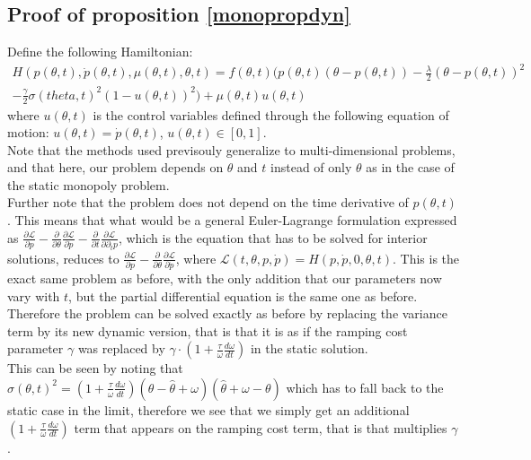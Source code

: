 \begin{subappendices}
\section{Proof of proposition \ref{monopropdyn}}\label{monopdyn_proof}

Define the following Hamiltonian: 
\begin{equation}
\begin{split}
H(p(\theta,t),\dot{p}(\theta,t),\mu(\theta,t),\theta,t)= f(\theta,t)\bigg( p(\theta,t)(\theta-p(\theta,t))-\frac{\lambda}{2}(\theta-p(\theta,t))^2\\
-\frac{\gamma}{2}\sigma(theta,t)^2\left(1-u(\theta,t)\right)^2\bigg)+\mu(\theta,t) u(\theta,t)
\end{split}
\end{equation}
where $u(\theta,t)$ is the control variables defined through the following equation of motion: $u(\theta,t)=\dot{p}(\theta,t)$, $u(\theta,t)\in[0,1]$. \\

Note that the methods used previsouly generalize to multi-dimensional problems, and that here, our problem depends on $\theta$ and $t$ instead of only $\theta$ as in the case of the static monopoly problem. \\

Further note that the problem does not depend on the time derivative of $p(\theta,t)$. This means that what would be a general Euler-Lagrange formulation expressed as $\frac{\partial\mathcal{L}}{\partial p} - \frac{\partial}{\partial \theta}\frac{\partial \mathcal{L}}{\partial \dot{p}} - \frac{\partial}{\partial t}\frac{\partial \mathcal{L}}{\partial \partial_t p}$, which is the equation that has to be solved for interior solutions, reduces to  $\frac{\partial\mathcal{L}}{\partial p} - \frac{\partial}{\partial \theta}\frac{\partial \mathcal{L}}{\partial \dot{p}}$, where  $\mathcal{L}(t,\theta,p,\dot{p}) = H(p,\dot{p},0,\theta,t)$. This is the exact same problem as before, with the only addition that our parameters now vary with $t$, but the partial differential equation is the same one as before. \\

Therefore the problem can be solved exactly as before by replacing the variance term by its new dynamic version, that is that it is as if the ramping cost parameter $\gamma$ was replaced by $\gamma \cdot \left( 1+ \frac{\tau}{\omega}\frac{d\omega}{dt}\right)$ in the static solution.\\

This can be seen by noting that $\sigma(\theta,t)^2 = \left(1+\frac{\tau}{\omega}\frac{d\omega}{dt}\right)(\theta-\hat{\theta}+\omega)(\hat{\theta}+\omega-\theta)$ which has to fall back to the static case in the limit, therefore we see that we simply get an additional $\left(1+\frac{\tau}{\omega}\frac{d\omega}{dt}\right)$ term that appears on the ramping cost term, that is that multiplies $\gamma$.


\end{subappendices}
